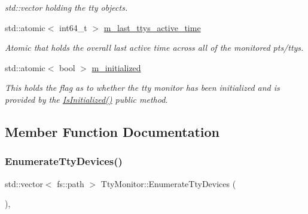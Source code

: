 \begin{DoxyCompactItemize}
\begin{DoxyCompactList}\small\item\em std\+::vector holding the tty objects. \end{DoxyCompactList}\item 
\mbox{\label{classEventDetect_1_1TtyMonitor_a3b8c2310acdd1549c3e57de230ffdcef}} 
std\+::atomic$<$ int64\+\_\+t $>$ \mbox{\hyperlink{classEventDetect_1_1TtyMonitor_a3b8c2310acdd1549c3e57de230ffdcef}{m\+\_\+last\+\_\+ttys\+\_\+active\+\_\+time}}
\begin{DoxyCompactList}\small\item\em Atomic that holds the overall last active time across all of the monitored pts/ttys. \end{DoxyCompactList}\item 
\mbox{\label{classEventDetect_1_1TtyMonitor_a908ced0aaf053b25b2633e5cbe3f8ad7}} 
std\+::atomic$<$ bool $>$ \mbox{\hyperlink{classEventDetect_1_1TtyMonitor_a908ced0aaf053b25b2633e5cbe3f8ad7}{m\+\_\+initialized}}
\begin{DoxyCompactList}\small\item\em This holds the flag as to whether the tty monitor has been initialized and is provided by the \mbox{\hyperlink{classEventDetect_1_1TtyMonitor_a7a3482d371bfa556a13c9ee11ca1a2c2}{Is\+Initialized()}} public method. \end{DoxyCompactList}\end{DoxyCompactItemize}


\subsection{Member Function Documentation}
\mbox{\label{classEventDetect_1_1TtyMonitor_ab0a2e0d72dba323fad08077825432da0}} 
\subsubsection{\texorpdfstring{Enumerate\+Tty\+Devices()}{EnumerateTtyDevices()}}
{\footnotesize\ttfamily std\+::vector$<$ fs\+::path $>$ Tty\+Monitor\+::\+Enumerate\+Tty\+Devices (\begin{DoxyParamCaption}{ }\end{DoxyParamCaption})\hspace{0.3cm}{\ttfamily [static]}, {\ttfamily [private]}}



